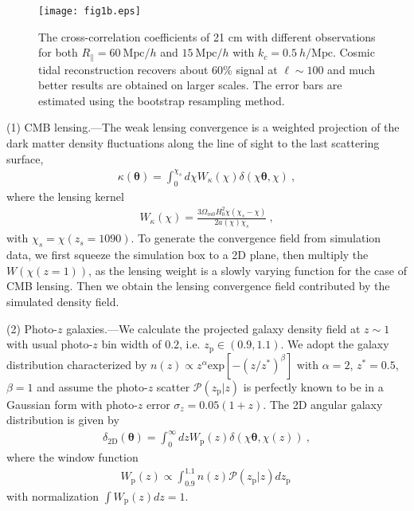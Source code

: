 \documentclass[aps,prl,twocolumn,showpacs,superscriptaddress,groupedaddress,nofootinbib,floatfix]{revtex4}  %
\newcommand{\mr}{\mathrm}
\begin{document}
\begin{figure}[tbp]
\begin{center}
\texttt{[image: fig1b.eps]}
\end{center}
\vspace{-0.7cm}
\caption{The cross-correlation coefficients of 21 cm with different 
observations for both $R_\parallel=60\ \mr{Mpc}/h$ and $15\ \mr{Mpc}/h$ with 
$k_c=0.5\ h/\mr{Mpc}$. Cosmic tidal reconstruction recovers about 60\% signal 
at $\ell\sim100$ and much better results are obtained on larger scales. 
The error bars are estimated using the bootstrap resampling method.}
\label{fig:cc}
\end{figure}


(1) CMB lensing.---The weak lensing convergence is a weighted projection
of the dark matter density fluctuations along the line of sight to the last 
scattering surface,
\begin{eqnarray}
\kappa(\bm{\theta})=\int_0^{\chi_s}d\chi 
W_\kappa(\chi)\delta(\chi\bm{\theta},\chi)\ ,
\end{eqnarray}
where the lensing kernel
\begin{eqnarray}
W_\kappa(\chi)=\frac{3\Omega_{m0}H_0^2\chi(\chi_s-\chi)}{2a(\chi)\chi_s}\ ,
\end{eqnarray}
with $\chi_s=\chi(z_s=1090)$.
To generate the convergence field from simulation data, we first squeeze the 
simulation box to a 2D plane, then multiply the $W(\chi(z=1))$, as the 
lensing weight is a slowly varying function for the case of CMB lensing.
Then we obtain the lensing convergence field contributed by the simulated 
density field.

(2) Photo-$z$ galaxies.---We calculate the projected galaxy density field at 
$z\sim 1$ with usual photo-$z$ bin width of $0.2$, i.e. $z_\mr{p}\in(0.9,1.1)$. 
We adopt the galaxy distribution characterized by 
$n(z)\propto z^{\alpha}\mr{exp}[-(z/z^{*})^\beta]$
with $\alpha=2$, $z^*=0.5$, $\beta=1$
and assume the photo-$z$ scatter $\mathcal{P}(z_\mr{p}|z)$ is perfectly known to be in a Gaussian form with photo-$z$ error $\sigma_z=0.05(1+z)$.
The 2D angular galaxy distribution is given by
\begin{eqnarray}
\delta_\mr{2D}(\bm{\theta})=\int_0^\infty dzW_\mr{p}(z)
\delta(\chi\bm{\theta},\chi(z))\ ,
\end{eqnarray}
where the window function 
\begin{eqnarray}
W_\mr{p}(z)\propto\int_{0.9}^{1.1} n(z) \mathcal{P}(z_\mr{p}|z) dz_\mr{p}\ 
\end{eqnarray}
with normalization $\int W_\mr{p}(z)dz=1$.
\end{document}
